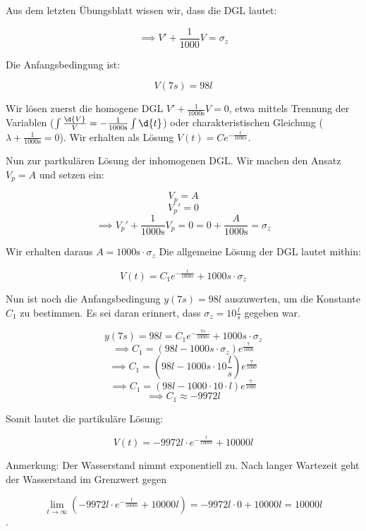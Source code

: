 \item

Aus dem letzten Übungsblatt wissen wir, dass die DGL lautet:

$$\implies V' + \frac{1}{1000} V = \sigma_z$$

Die Anfangsbedingung ist:

$$V(7s) = 98l$$

Wir lösen zuerst die homogene DGL $V'+\frac{1}{1000\text{s}}V = 0$, etwa mittels Trennung der Variablen ($\int\frac{\d{V}}{V}=-\frac{1}{1000\text{s}}\int\d{t}$) oder charakteristischen Gleichung ($\lambda + \frac{1}{1000\text{s}}=0$). Wir erhalten als Lösung $V(t) = C e^{-\frac{t}{1000s}}$. 

Nun zur partkulären Lösung der inhomogenen DGL. Wir machen den Ansatz $V_p=A$ und setzen ein:

$$ V_p = A $$
$$ V_p' = 0 $$
$$\implies V_p'+\frac{1}{1000\text{s}}V_p = 0 = 0 + \frac{A}{1000\text{s}} = \sigma_z$$

Wir erhalten daraus $A = 1000\text{s}\cdot \sigma_z$ Die allgemeine Lösung der DGL lautet mithin:

$$V(t) = C_1 e^{-\frac{t}{1000s}} + 1000s\cdot\sigma_z$$

Nun ist noch die Anfangsbedingung $y(7s) = 98l$ auszuwerten, um die Konstante $C_1$ zu bestimmen. Es sei daran erinnert, dass $\sigma_z = 10 \frac{l}{s}$ gegeben war.

$$y(7s) = 98l = C_1 e^{-\frac{7s}{1000s}} + 1000s\cdot\sigma_z$$
$$\implies C_1 = (98l - 1000s\cdot\sigma_z) e^{\frac{7}{1000}}$$
$$\implies C_1 = (98l - 1000s\cdot 10 \frac{l}{s}) e^{\frac{7}{1000}}$$
$$\implies C_1 = (98l - 1000 \cdot 10 \cdot l) e^{\frac{7}{1000}}$$
$$\implies C_1 \approx -9972l$$

Somit lautet die partikuläre Lösung:

$$V(t) = -9972l \cdot e^{-\frac{t}{1000s}} + 10000l $$

Anmerkung: Der Wasserstand nimmt exponentiell zu. Nach langer Wartezeit geht der Wasserstand im Grenzwert gegen

$$\lim\limits_{t\to\infty}\left(-9972l \cdot e^{-\frac{t}{1000s}} + 10000l\right) = -9972l\cdot 0 + 10000l = 10000l$$.

